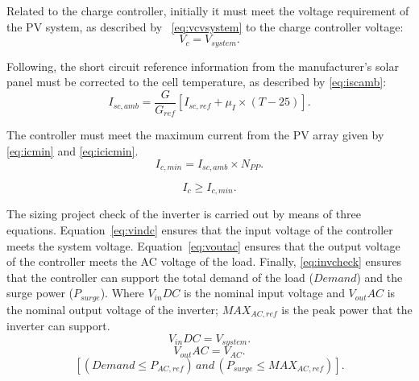 \documentclass[10pt,conference]{IEEEtran}
\begin{document}
Related to the charge controller, initially it must meet the voltage requirement of the PV system, as described by ~\eqref{eq:vcvsystem} to the charge controller voltage: 
\begin{equation}
\label{eq:vcvsystem}
\scriptstyle V_{c} = \scriptstyle V_{system}.
\end{equation}

Following, the short circuit reference information from the manufacturer's solar panel must be corrected to the cell temperature, as described by \eqref{eq:iscamb}:
%
\begin{equation}
\label{eq:iscamb}
\scriptstyle I_{sc,amb} = \dfrac{\scriptstyle G}{\scriptstyle G_{ref}} \left[ \scriptstyle I_{sc,ref} + \scriptstyle \mu_{I} \scriptstyle \times \scriptstyle (T-25) \right]. 
\end{equation}

The controller must meet the maximum current from the PV array given by \eqref{eq:icmin} and \eqref{eq:icicmin}.
\begin{equation}
\label{eq:icmin}
\scriptstyle I_{c,min} = \scriptstyle I_{sc,amb} \times \scriptstyle N_{PP}.
\end{equation}

\begin{equation}
\label{eq:icicmin}
\scriptstyle I_{c} \geq \scriptstyle I_{c,min}.
\end{equation}

The sizing project check of the inverter is carried out by means of three equations. Equation~\eqref{eq:vindc} ensures that the input voltage of the controller meets the system voltage. Equation~\eqref{eq:voutac} ensures that the output voltage of the controller meets the AC voltage of the load. Finally, \eqref{eq:invcheck} ensures that the controller can support the total demand of the load ($Demand$) and the surge power ($P_{surge}$). Where $V_{in}DC$ is the nominal input voltage and $V_{out}AC$ is the nominal output voltage of the inverter; $MAX_{AC,ref}$ is the peak power that the inverter can support.
%
\begin{equation}
\label{eq:vindc} 
\scriptstyle V_{in}DC = \scriptstyle V_{system}.
\end{equation}
%
\begin{equation}
\label{eq:voutac} 
\scriptstyle V_{out}AC = \scriptstyle V_{AC}.
\end{equation}
%
\begin{equation}
\label{eq:invcheck} 
\left[ (\scriptstyle Demand \leq \scriptstyle P_{AC,ref}) \, \scriptstyle and \, \scriptstyle (P_{surge} \leq MAX_{AC,ref}) \right].
\end{equation}
\end{document}
